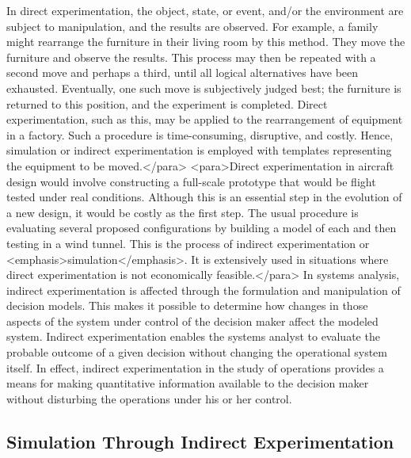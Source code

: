 In direct experimentation, the object, state, or event, and/or the environment are subject to manipulation, and the results are observed. For example, a family might rearrange the furniture in their living room by this method. They move the furniture and observe the results. This process may then be repeated with a second move and perhaps a third, until all logical alternatives have been exhausted. Eventually, one such move is subjectively judged best; the furniture is returned to this position, and the experiment is completed. Direct experimentation, such as this, may be applied to the rearrangement of equipment in a factory. Such a procedure is time-consuming, disruptive, and costly. Hence, simulation or indirect experimentation is employed with templates representing the equipment to be moved.</para>
<para>Direct experimentation in aircraft design would involve constructing a full-scale prototype that would be flight tested under real conditions. Although this is an essential step in the evolution of a new design, it would be costly as the first step. The usual procedure is evaluating several proposed configurations by building a model of each and then testing in a wind tunnel. This is the process of indirect experimentation or <emphasis>simulation</emphasis>. It is extensively used in situations where direct experimentation is not economically feasible.</para>
In systems analysis, indirect experimentation is affected through the formulation and manipulation of decision models. This makes it possible to determine how changes in those aspects of the system under control of the decision maker affect the modeled system. Indirect experimentation enables the systems analyst to evaluate the probable outcome of a given decision without changing the operational system itself. In effect, indirect experimentation in the study of operations provides a means for making quantitative information available to the decision maker without disturbing the operations under his or her control.

\subsection{Simulation Through Indirect Experimentation}

